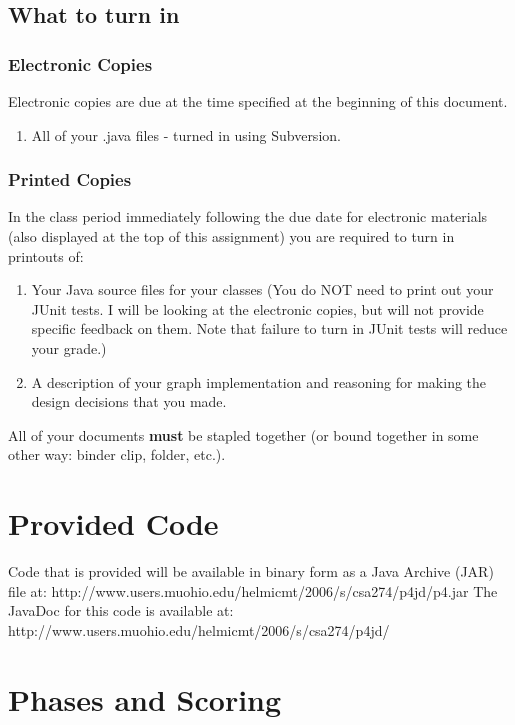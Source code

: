 \documentclass[11pt]{article}
\begin{document}
\subsection*{What to turn in}
\subsubsection*{Electronic Copies}
Electronic copies are due at the time specified at the beginning of this document.
\begin{enumerate}
   \item All of your .java files - turned in using Subversion.
\end{enumerate}

\subsubsection*{Printed Copies}
In the class period immediately following the due date for electronic materials (also displayed at the top of this assignment) you are required to turn in printouts of:
\begin{enumerate}
   \item Your Java source files for your classes (You do NOT need to print out your JUnit tests.  I will be looking at the electronic copies, but will not provide specific feedback on them.  Note that failure to turn in JUnit tests will reduce your grade.)
   \item A description of your graph implementation and reasoning for making the design decisions that you made.
\end{enumerate}
  All of your documents {\bf must} be stapled together (or bound together in some other way: binder clip, folder, etc.).  

\section*{Provided Code}
Code that is provided will be available in binary form as a Java Archive (JAR) file at: \newline   
\hspace{.5in} http://www.users.muohio.edu/helmicmt/2006/s/csa274/p4jd/p4.jar \newline
The JavaDoc for this code is available at: \newline
\hspace{.5in} http://www.users.muohio.edu/helmicmt/2006/s/csa274/p4jd/

\section*{Phases and Scoring}
\end{document}
